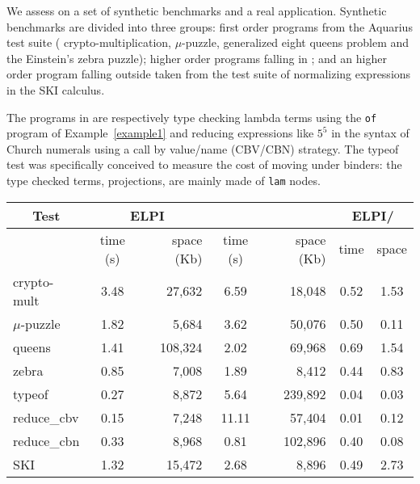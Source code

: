 \documentclass{llncs}
\begin{document}
We assess %
\elpi{} on a set of synthetic benchmarks and
a real application. Synthetic benchmarks are divided into three groups:
first order programs from the Aquarius test suite (%
crypto-multiplication, $\mu$-puzzle,
generalized eight queens problem and the Einstein's zebra puzzle);
higher order programs falling in \rff{}; and an higher
order program falling outside \rff{} taken from the test suite of
\tedius{} normalizing expressions in the SKI calculus.

The programs in \rff{} are respectively type checking lambda terms using
the \verb+of+ program of Example~\ref{example1} and reducing expressions like
$5^5$ in the syntax of Church numerals using a call by value/name (CBV/CBN)
strategy.  The typeof test was specifically conceived to measure the cost of
moving under binders: the type checked terms, projections, are mainly made of
\verb+lam+ nodes.

\begin{center}
  \scriptsize 
  \begin{tabular}{|p{1.5cm}||c|r||c|r||c|c|}
    \hline
      \multicolumn{1}{|c||}{Test} &
      \multicolumn{2}{|c||}{ELPI} &
      \multicolumn{2}{|c||}{\tedius{}} &
      \multicolumn{2}{|c|}{ELPI/\tedius{}} \\
    \hline
    &  time (s)     & space (Kb)  & time (s) & space (Kb) &  time & space \\
    \hline
    \hline
    crypto-mult &  3.48 & 27,632  & 6.59 & 18,048 &  0.52 & 1.53 \\
    \hline    
    $\mu$-puzzle &  1.82 & 5,684 &  3.62 & 50,076 &  0.50 & 0.11 \\
    \hline
    queens &  1.41  & 108,324 &  2.02 & 69,968 &  0.69 & 1.54 \\
    \hline    
    zebra &  0.85 & 7,008 &  1.89 & 8,412 &  0.44 & 0.83 \\
    \hline     
    \hline
    typeof &  0.27 & 8,872 &  5.64 & 239,892 &  0.04 & 0.03 \\
    \hline
    reduce\_cbv &  0.15 & 7,248 &  11.11 & 57,404  & 0.01 & 0.12 \\
    \hline
    reduce\_cbn &  0.33 & 8,968 &  0.81 & 102,896  & 0.40 & 0.08 \\
    \hline
    \hline
    SKI &  1.32 & 15,472 &  2.68 & 8,896  & 0.49 & 2.73 \\
    \hline
    
  \end{tabular}
\end{center}
\end{document}
